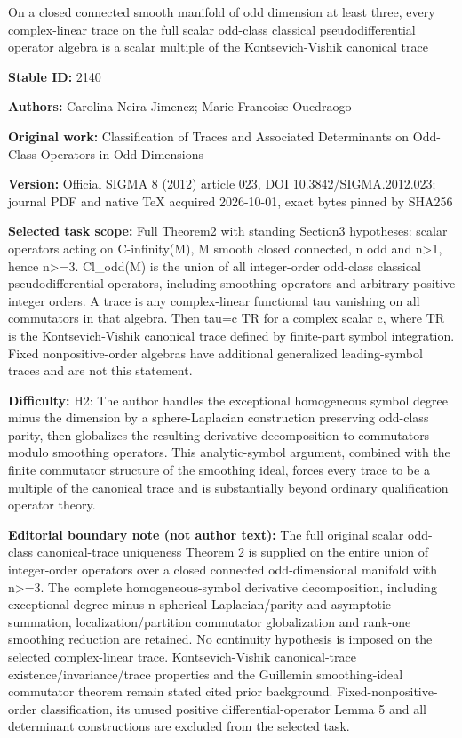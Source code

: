 \documentclass[11pt]{article}
\begin{document}
\begin{center}\Large On a closed connected smooth manifold of odd dimension at least three, every complex-linear trace on the full scalar odd-class classical pseudodifferential operator algebra is a scalar multiple of the Kontsevich-Vishik canonical trace\end{center}
\noindent\textbf{Stable ID:} 2140\par
\noindent\textbf{Authors:} Carolina Neira Jimenez; Marie Francoise Ouedraogo\par
\noindent\textbf{Original work:} Classification of Traces and Associated Determinants on Odd-Class Operators in Odd Dimensions\par
\noindent\textbf{Version:} Official SIGMA 8 (2012) article 023, DOI 10.3842/SIGMA.2012.023; journal PDF and native TeX acquired 2026-10-01, exact bytes pinned by SHA256\par
\noindent\textbf{Selected task scope:} Full Theorem2 with standing Section3 hypotheses: scalar operators acting on C-infinity(M), M smooth closed connected, n odd and n>1, hence n>=\allowbreak{}3. Cl\_odd(M) is the union of all integer-order odd-class classical pseudodifferential operators, including smoothing operators and arbitrary positive integer orders. A trace is any complex-linear functional tau vanishing on all commutators in that algebra. Then tau=\allowbreak{}c TR for a complex scalar c, where TR is the Kontsevich-Vishik canonical trace defined by finite-part symbol integration. Fixed nonpositive-order algebras have additional generalized leading-symbol traces and are not this statement.\par
\noindent\textbf{Difficulty:} H2: The author handles the exceptional homogeneous symbol degree minus the dimension by a sphere-Laplacian construction preserving odd-class parity, then globalizes the resulting derivative decomposition to commutators modulo smoothing operators. This analytic-symbol argument, combined with the finite commutator structure of the smoothing ideal, forces every trace to be a multiple of the canonical trace and is substantially beyond ordinary qualification operator theory.\par
\noindent\textbf{Editorial boundary note (not author text):} The full original scalar odd-class canonical-trace uniqueness Theorem 2 is supplied on the entire union of integer-order operators over a closed connected odd-dimensional manifold with n>=\allowbreak{}3. The complete homogeneous-symbol derivative decomposition, including exceptional degree minus n spherical Laplacian/parity and asymptotic summation, localization/partition commutator globalization and rank-one smoothing reduction are retained. No continuity hypothesis is imposed on the selected complex-linear trace. Kontsevich-Vishik canonical-trace existence/invariance/trace properties and the Guillemin smoothing-ideal commutator theorem remain stated cited prior background. Fixed-nonpositive-order classification, its unused positive differential-operator Lemma 5 and all determinant constructions are excluded from the selected task.\par
\end{document}
